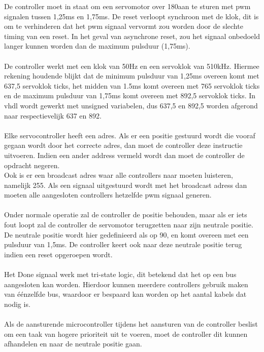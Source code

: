 De controller moet in staat om een servomotor over 180\textdegree  aan te sturen met \gls{pwm} signalen tussen 1,25ms en 1,75ms. De reset verloopt synchroon met de klok, dit is om te verhinderen dat het \gls{pwm} signaal vervormt zou worden door de slechte timing van een reset. In het geval van asynchrone reset, zou het  signaal onbedoeld langer kunnen worden dan de maximum pulsduur (1,75ms).\\
\\
De controller werkt met een klok van 50Hz en een servoklok van 510kHz. Hiermee rekening houdende blijkt dat de minimum pulsduur van 1,25ms overeen komt met 637,5 servoklok ticks, het midden van 1.5ms komt overeen met 765 servoklok ticks en de maximum pulsduur van 1,75ms komt overeen met 892,5 servoklok ticks. In \gls{vhdl} wordt gewerkt met unsigned variabelen, dus 637,5 en 892,5 worden afgerond naar respectievelijk 637 en 892.\\
\\
Elke servocontroller heeft een adres. Als er een positie gestuurd wordt die vooraf gegaan wordt door het correcte adres, dan moet de controller deze instructie uitvoeren. Indien een ander address vermeld wordt dan moet de controller de opdracht negeren.\\
Ook is er een broadcast adres waar alle controllers  naar moeten luisteren, namelijk 255. Als een signaal uitgestuurd wordt met het broadcast adress dan moeten alle aangesloten controllers hetzelfde \gls{pwm} signaal generen.\\
\\
Onder normale operatie zal de controller de positie behouden, maar als er iets fout loopt zal de controller de servomotor terugzetten naar zijn neutrale positie. De neutrale positie wordt hier gedefinieerd als op 90\textdegree, en komt overeen met een pulsduur van 1,5ms. De controller keert ook naar deze neutrale positie terug indien een reset opgeroepen wordt.\\
\\
Het Done signaal werk met tri-state logic, dit betekend dat het op een bus aangesloten kan worden. Hierdoor kunnen meerdere controllers gebruik maken van \'{e}\'{e}nzelfde bus, waardoor er bespaard kan worden op het aantal kabels dat nodig is.\\
\\
Als de aansturende microcontroller tijdens het aansturen van de controller beslist om een taak van hogere prioriteit uit te voeren, moet de controller dit kunnen afhandelen en naar de neutrale positie gaan.\\
